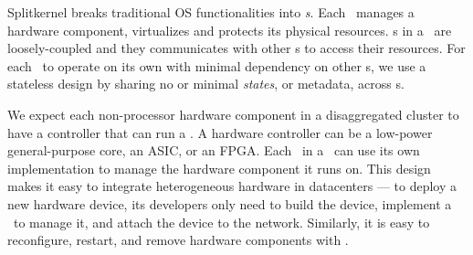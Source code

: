 \documentclass[10pt,times,twocolumn]{z2-article}
\begin{document}
Splitkernel breaks traditional OS functionalities into {\em \microos{}s}.
Each \microos\ manages a hardware component, virtualizes and protects its physical resources.
\microos{}s in a \splitkernel\ are loosely-coupled and 
they communicates with other \microos{}s to access their resources. 
For each \microos\ to operate on its own with minimal dependency on other \microos{}s,
we use a stateless design by sharing no or minimal {\em states}, or metadata,
across \microos{}s.


We expect each non-processor hardware component in a disaggregated cluster to have a controller that 
can run a \microos.
A hardware controller can be a low-power general-purpose core, an ASIC, or an FPGA.
Each \microos\ in a \splitkernel\ can use its own implementation to manage the hardware component it runs on.
This design makes it easy to integrate heterogeneous hardware in datacenters ---
to deploy a new hardware device, its developers only need to build the device,
implement a \microos\ to manage it, %
and attach the device to the network. 
Similarly, it is easy to reconfigure, restart, and remove hardware components with \splitkernel.
\end{document}
